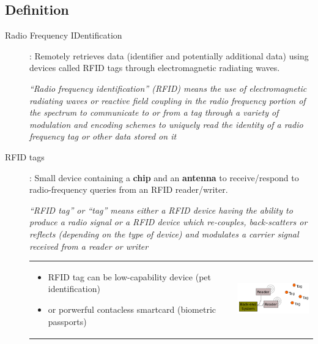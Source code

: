 \subsection{Definition}

\begin{description}
    \item[Radio Frequency IDentification]: Remotely retrieves data
        (identifier and potentially additional data) using devices
        called RFID tags through electromagnetic radiating waves.

        \begin{center}
            \textit{“Radio frequency identification” (RFID) means the use of
                electromagnetic radiating waves or reactive field coupling in the
                radio frequency portion of the spectrum to communicate to or
                from a tag through a variety of modulation and encoding schemes
                to uniquely read the identity of a radio frequency tag or other data
            stored on it}
        \end{center}

    \item[RFID tags]: Small device containing a \textbf{chip} and an
        \textbf{antenna} to receive/respond to radio-frequency queries
        from an RFID reader/writer.

        \begin{center}
            \textit{“RFID tag” or “tag” means either a RFID device having the ability
                to produce a radio signal or a RFID device which re-couples,
                back-scatters or reflects (depending on the type of device) and
            modulates a carrier signal received from a reader or writer}
        \end{center}

        \begin{tabular}{m{10cm}m{4cm}}
            \begin{itemize}
                \item RFID tag can be low-capability device (pet
                    identification)
                \item or porwerful contacless smartcard (biometric
                    passports)
            \end{itemize}
            &
            \includegraphics[width=4cm]{img/archRFID}
        \end{tabular}
\end{description}

